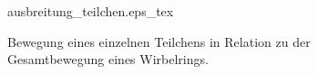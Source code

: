 \begin{figure}
\centering
\def\svgwidth{0.4\columnwidth}
{ausbreitung_teilchen.eps_tex}
\caption{Bewegung eines einzelnen Teilchens in Relation zu der Gesamtbewegung eines Wirbelrings. \label{Wirbelringe:fig:ausbreitung_teilchen}}
\end{figure}